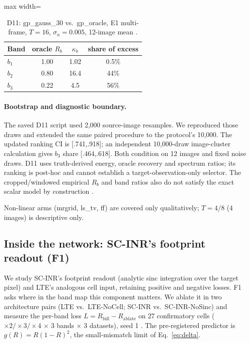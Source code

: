 \begin{table}[t]\centering\small
\caption{D11: gp\_gauss\_30 vs.\ gp\_oracle, E1 multi-frame, $T=16$,
$\sigma_n=0.005$, 12-image mean .}\label{tab:d11}
\begin{adjustbox}{max width=\linewidth}\begin{tabular}{lccc}\toprule
Band & oracle $R_b$ & $\kappa_b$ & share of excess\\\midrule
$b_1$ & 1.00 & 1.02 & 0.5\%\\
$b_2$ & 0.80 & 16.4 & 44\%\\
$b_3$ & 0.22 & 4.5 & 56\%\\
\bottomrule\end{tabular}\end{adjustbox}
\end{table}

\paragraph{Bootstrap and diagnostic boundary.} The saved D11 script used
2,000 source-image resamples. We reproduced those draws and extended the
same paired procedure to the protocol's 10,000. The updated ranking CI is
[.741,.918]; an independent 10,000-draw image-cluster calculation gives
$b_3$ share [.464,.618]. Both condition on 12 images and fixed noise draws.
D11 uses truth-derived energy, oracle recovery and spectrum ratios;
its ranking is post-hoc and cannot establish a target-observation-only
selector. The cropped/windowed empirical $R_b$ and band ratios also do not
satisfy the exact scalar model by construction .

\noindent Non-linear arms (mrgrid, ls\_tv, ff) are covered only
qualitatively; $T=4/8$ (4 images) is descriptive only.


\subsection{Inside the network: SC-INR's footprint readout (F1)}\label{sec:exp-f1}

We study SC-INR's footprint readout (analytic sinc integration over the target pixel) and LTE's analogous cell input, retaining positive and negative losses. F1 asks where in the band map this
component matters. We ablate it in two architecture pairs (LTE vs.\
LTE-NoCell; SC-INR vs.\ SC-INR-NoSinc) and measure the per-band loss
$L=R_{\mathrm{full}}-R_{\mathrm{ablate}}$ on 27 confirmatory cells
($\times2/\times3/\times4$ $\times$ 3 bands $\times$ 3 datasets), seed 1
\src{F1}. The pre-registered predictor is $g(R)=R(1-R)^2$, the
small-mismatch limit of Eq.~\eqref{eq:delta}.

